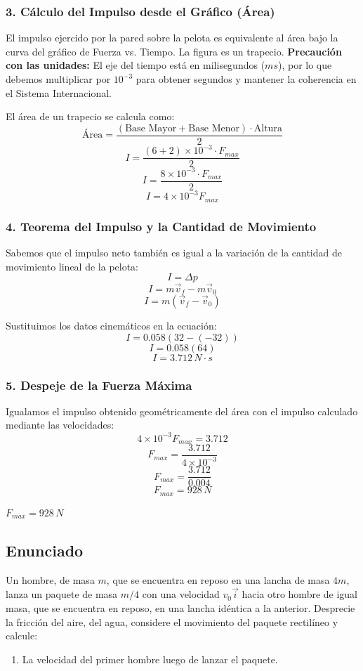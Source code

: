 \documentclass[12pt, a4paper]{article}
\begin{document}
\subsubsection*{3. Cálculo del Impulso desde el Gráfico (Área)}
El impulso ejercido por la pared sobre la pelota es equivalente al área bajo la curva del gráfico de Fuerza vs. Tiempo. La figura es un trapecio.
\textbf{Precaución con las unidades:} El eje del tiempo está en milisegundos ($\si{ms}$), por lo que debemos multiplicar por $10^{-3}$ para obtener segundos y mantener la coherencia en el Sistema Internacional.

El área de un trapecio se calcula como:
\[ \text{Área} = \frac{(\text{Base Mayor} + \text{Base Menor}) \cdot \text{Altura}}{2} \]
\[ I = \frac{(6 + 2) \times 10^{-3} \cdot F_{max}}{2} \]
\[ I = \frac{8 \times 10^{-3} \cdot F_{max}}{2} \]
\[ I = 4 \times 10^{-3} F_{max} \]

\subsubsection*{4. Teorema del Impulso y la Cantidad de Movimiento}
Sabemos que el impulso neto también es igual a la variación de la cantidad de movimiento lineal de la pelota:
\[ I = \Delta p \]
\[ I = m \vec{v}_f - m \vec{v}_0 \]
\[ I = m (\vec{v}_f - \vec{v}_0) \]

Sustituimos los datos cinemáticos en la ecuación:
\[ I = 0.058 \left( 32 - (-32) \right) \]
\[ I = 0.058 (64) \]
\[ I = 3.712 \, \si{N\cdot s} \]

\subsubsection*{5. Despeje de la Fuerza Máxima}
Igualamos el impulso obtenido geométricamente del área con el impulso calculado mediante las velocidades:
\[ 4 \times 10^{-3} F_{max} = 3.712 \]
\[ F_{max} = \frac{3.712}{4 \times 10^{-3}} \]
\[ F_{max} = \frac{3.712}{0.004} \]
\[ F_{max} = 928 \, \si{N} \]

\begin{tcolorbox}[colback=green!5!white, colframe=green!50!black, title=Respuesta Final]
\centering \Large $F_{max} = 928 \, \si{N}$
\end{tcolorbox}

\newpage

\subsection*{Enunciado}
Un hombre, de masa $m$, que se encuentra en reposo en una lancha de masa $4m$, lanza un paquete de masa $m/4$ con una velocidad $v_0\vec{i}$ hacia otro hombre de igual masa, que se encuentra en reposo, en una lancha idéntica a la anterior. Desprecie la fricción del aire, del agua, considere el movimiento del paquete rectilíneo y calcule:
\begin{enumerate}[label=\alph*)]
    \item La velocidad del primer hombre luego de lanzar el paquete.
\end{enumerate}
\end{document}
